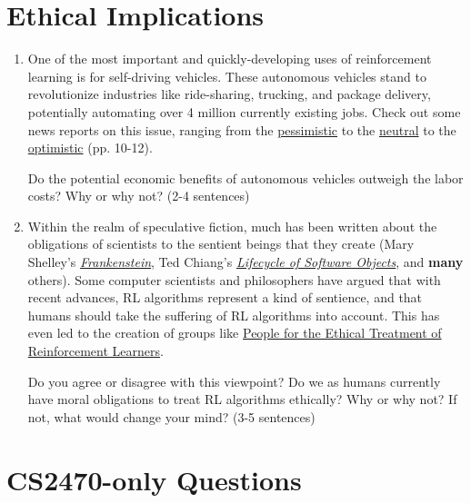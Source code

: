 \documentclass{article}
\begin{document}
\section{Ethical Implications}
\begin{enumerate}
\item One of the most important and quickly-developing uses of reinforcement learning is for self-driving vehicles. These autonomous vehicles stand to revolutionize industries like ride-sharing, trucking, and package delivery, potentially automating over 4 million currently existing jobs. Check out some news reports on this issue, ranging from the \href{https://www.cnbc.com/2017/05/22/goldman-sachs-analysis-of-autonomous-vehicle-job-loss.html}{pessimistic} to the \href{https://www.wired.com/story/guide-self-driving-cars/}{neutral} to the \href{https://avworkforce.secureenergy.org/wp-content/uploads/2018/06/Americas-Workforce-and-the-Self-Driving-Future_Realizing-Productivity-Gains-and-Spurring-Economic-Growth.pdf}{optimistic} (pp. 10-12).

Do the potential economic benefits of autonomous vehicles outweigh the labor costs? Why or why not? (2-4 sentences)

\item Within the realm of speculative fiction, much has been written about the obligations of scientists to the sentient beings that they create (Mary Shelley’s \href{https://www.planetebook.com/free-ebooks/frankenstein.pdf}{\textit{Frankenstein}}, Ted Chiang’s \href{https://cpb-us-w2.wpmucdn.com/voices.uchicago.edu/dist/8/644/files/2017/08/Chiang-Lifecycle-of-Software-Objects-q3tsuw.pdf}{\textit{Lifecycle of Software Objects}}, and \textbf{many} others). Some computer scientists and philosophers have argued that with recent advances, RL algorithms represent a kind of sentience, and that humans should take the suffering of RL algorithms into account. This has even led to the creation of groups like \href{http://petrl.org/}{People for the Ethical Treatment of Reinforcement Learners}.

Do you agree or disagree with this viewpoint? Do we as humans currently have moral obligations to treat RL algorithms ethically? Why or why not? If not, what would change your mind? (3-5 sentences)
    
\end{enumerate}

\section{CS2470-only Questions}
\end{document}
